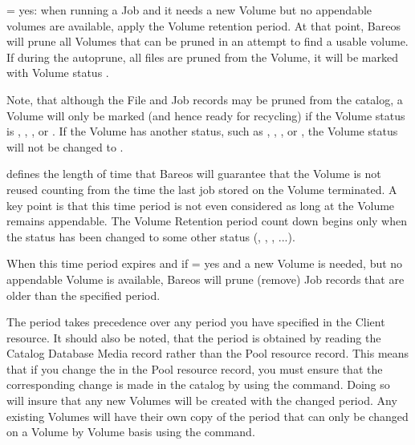 \begin{description}

\item {} = yes:
   when running a Job  and it needs a new Volume but no appendable volumes are available, apply the Volume retention period.
   At that point,
   Bareos will prune all Volumes that can be pruned in an
   attempt to find a usable volume. If  during the autoprune, all files are
   pruned from the Volume, it will be marked with Volume status .

   Note, that although the File and Job records may be
   pruned from the catalog, a Volume will only be marked  (and hence
   ready for recycling) if the Volume status is , , , or .
   If the Volume has another status, such as , , ,
    or , the Volume status will not be changed to .

\item {}
   defines the length of time that Bareos will
   guarantee that the Volume is not reused counting from the time the last
   job stored on the Volume terminated.  A key point is that this time
   period is not even considered as long at the Volume remains appendable.
   The Volume Retention period count down begins only when the 
   status has been changed to some other status (, , , ...).

   When this time period expires and if  = yes
   and a new Volume is needed, but no appendable Volume is available,
   Bareos will prune (remove) Job records that are older than the specified
    period.

   The  period takes precedence over any 
   period you have specified in the Client resource.  It should also be
   noted, that the  period is obtained by reading the
   Catalog Database Media record rather than the Pool resource record.
   This means that if you change the  in the Pool resource
   record, you must ensure that the corresponding change is made in the
   catalog by using the  command.  Doing so will insure
   that any new Volumes will be created with the changed 
   period.  Any existing Volumes will have their own copy of the 
   period that can only be changed on a Volume by Volume basis
   using the  command.


\end{description}
